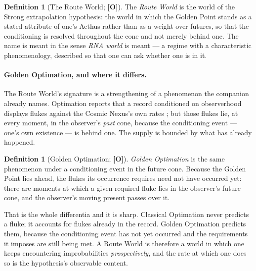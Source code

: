 \documentclass[11pt]{article}
\numberwithin{equation}{section}
\theoremstyle{plain}
\theoremstyle{definition}
\newtheorem{definition}[theorem]{Definition}
\theoremstyle{remark}
\begin{document}
\begin{definition}[The Route World; \textbf{[O]}]\label{gc:def:routeworld}
The \emph{Route World} is the world of the Strong extrapolation
hypothesis: the world in which the Golden Point stands as a stated
attribute of one's Aethus rather than as a weight over futures, so that
the conditioning is resolved throughout the cone and not merely behind
one. The name is meant in the sense \emph{RNA world} is meant --- a
regime with a characteristic phenomenology, described so that one can
ask whether one is in it.
\end{definition}

\paragraph{Golden Optimation, and where it differs.} The Route World's
signature is a strengthening of a phenomenon the companion already
names. Optimation reports that a record conditioned on observerhood
displays flukes against the Cosmic Nexus's own rates \cite{Nexus}; but
those flukes lie, at every moment, in the observer's \emph{past} cone,
because the conditioning event --- one's own existence --- is behind one.
The supply is bounded by what has already happened.

\begin{definition}[Golden Optimation; \textbf{[O]}]\label{gc:def:goldenopt}
\emph{Golden Optimation} is the same phenomenon under a conditioning
event in the future cone. Because the Golden Point lies ahead, the
flukes its occurrence requires need not have occurred yet: there are
moments at which a given required fluke lies in the observer's future
cone, and the observer's moving present passes over it.
\end{definition}

That is the whole differentia and it is sharp. Classical Optimation
never predicts a fluke; it accounts for flukes already in the record.
Golden Optimation predicts them, because the conditioning event has not
yet occurred and the requirements it imposes are still being met. A
Route World is therefore a world in which one keeps encountering
improbabilities \emph{prospectively}, and the rate at which one does so
is the hypothesis's observable content.
\end{document}
